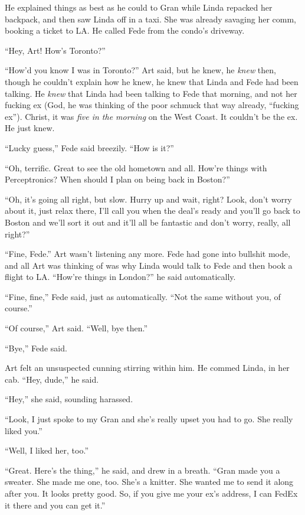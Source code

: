 He explained things as best as he could to Gran while Linda
repacked her backpack, and then saw Linda off in a taxi. She was
already savaging her comm, booking a ticket to LA. He called Fede
from the condo’s driveway.

“Hey, Art! How’s Toronto?”

“How’d you know I was in Toronto?” Art said, but he knew, he
\emph{knew} then, though he couldn’t explain how he knew, he knew
that Linda and Fede had been talking. He \emph{knew} that Linda had
been talking to Fede that morning, and not her fucking ex (God, he
was thinking of the poor schmuck that way already, “fucking ex”).
Christ, it was \emph{five in the morning} on the West Coast. It
couldn’t be the ex. He just knew.

“Lucky guess,” Fede said breezily. “How is it?”

“Oh, terrific. Great to see the old hometown and all. How’re things
with Perceptronics? When should I plan on being back in Boston?”

“Oh, it’s going all right, but slow. Hurry up and wait, right?
Look, don’t worry about it, just relax there, I’ll call you when
the deal’s ready and you’ll go back to Boston and we’ll sort it out
and it’ll all be fantastic and don’t worry, really, all right?”

“Fine, Fede.” Art wasn’t listening any more. Fede had gone into
bullshit mode, and all Art was thinking of was why Linda would talk
to Fede and then book a flight to LA. “How’re things in London?” he
said automatically.

“Fine, fine,” Fede said, just as automatically. “Not the same
without you, of course.”

“Of course,” Art said. “Well, bye then.”

“Bye,” Fede said.

Art felt an unsuspected cunning stirring within him. He commed
Linda, in her cab. “Hey, dude,” he said.

“Hey,” she said, sounding harassed.

“Look, I just spoke to my Gran and she’s really upset you had to
go. She really liked you.”

“Well, I liked her, too.”

“Great. Here’s the thing,” he said, and drew in a breath. “Gran
made you a sweater. She made me one, too. She’s a knitter. She
wanted me to send it along after you. It looks pretty good. So, if
you give me your ex’s address, I can FedEx it there and you can get
it.”

